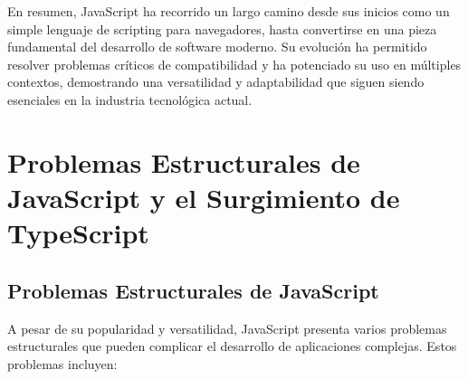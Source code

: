 \documentclass{article}
\begin{document}
En resumen, JavaScript ha recorrido un largo camino desde sus inicios como un simple lenguaje de scripting para
navegadores, hasta convertirse en una pieza fundamental del desarrollo de software moderno. Su evolución ha permitido
resolver problemas críticos de compatibilidad y ha potenciado su uso en múltiples contextos, demostrando una
versatilidad y adaptabilidad que siguen siendo esenciales en la industria tecnológica actual.

\section{Problemas Estructurales de JavaScript y el Surgimiento de TypeScript}

\subsection{Problemas Estructurales de JavaScript}

A pesar de su popularidad y versatilidad, JavaScript presenta varios problemas estructurales que pueden complicar
el desarrollo de aplicaciones complejas. Estos problemas incluyen:
\end{document}
